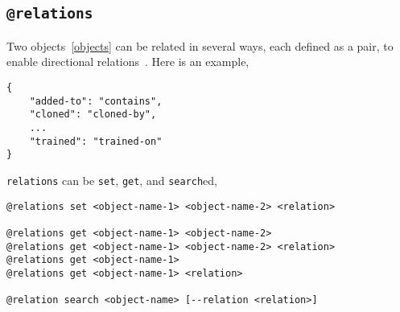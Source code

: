 \subsection{\texttt{@relations}}
\label{relations}

Two objects~\ref{objects} can be related in several ways, each defined as a pair, to enable directional relations~. Here is an example,
%
\begin{verbatim}
{
    "added-to": "contains",
    "cloned": "cloned-by",
    ...
    "trained": "trained-on"
}
\end{verbatim}
%
\texttt{relations} can be \texttt{set}, \texttt{get}, and \texttt{search}ed, 
%
\begin{verbatim}
@relations set <object-name-1> <object-name-2> <relation>

@relations get <object-name-1> <object-name-2>
@relations get <object-name-1> <object-name-2> <relation>
@relations get <object-name-1>
@relations get <object-name-1> <relation>

@relation search <object-name> [--relation <relation>]
\end{verbatim}